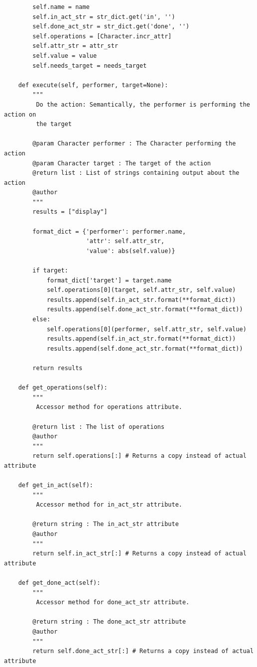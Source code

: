 \documentclass[11pt]{report}
\begin{document}
\begin{verbatim}
        self.name = name
        self.in_act_str = str_dict.get('in', '')
        self.done_act_str = str_dict.get('done', '')
        self.operations = [Character.incr_attr]
        self.attr_str = attr_str
        self.value = value
        self.needs_target = needs_target

    def execute(self, performer, target=None):
        """
         Do the action: Semantically, the performer is performing the action on
         the target

        @param Character performer : The Character performing the action
        @param Character target : The target of the action
        @return list : List of strings containing output about the action
        @author
        """
        results = ["display"]
        
        format_dict = {'performer': performer.name,
                       'attr': self.attr_str,
                       'value': abs(self.value)}

        if target:
            format_dict['target'] = target.name
            self.operations[0](target, self.attr_str, self.value)
            results.append(self.in_act_str.format(**format_dict))
            results.append(self.done_act_str.format(**format_dict))
        else:
            self.operations[0](performer, self.attr_str, self.value)
            results.append(self.in_act_str.format(**format_dict))
            results.append(self.done_act_str.format(**format_dict))

        return results

    def get_operations(self):
        """
         Accessor method for operations attribute.
         
        @return list : The list of operations
        @author
        """
        return self.operations[:] # Returns a copy instead of actual attribute

    def get_in_act(self):
        """
         Accessor method for in_act_str attribute.
         
        @return string : The in_act_str attribute
        @author
        """
        return self.in_act_str[:] # Returns a copy instead of actual attribute

    def get_done_act(self):
        """
         Accessor method for done_act_str attribute.
         
        @return string : The done_act_str attribute
        @author
        """
        return self.done_act_str[:] # Returns a copy instead of actual attribute
    

\end{verbatim}
\end{document}
